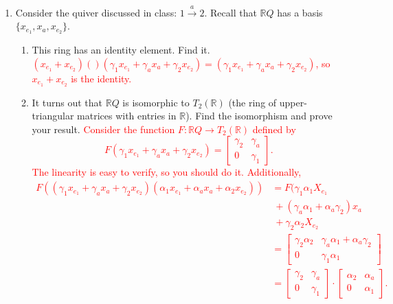 \documentclass[12pt]{article}
\newcommand{\bbR}{\mathbb{R}}
\newcommand{\solution}[1]{\textcolor{red}{#1}}
\begin{document}
\begin{enumerate}
\item Consider the quiver discussed in class: $1\xrightarrow{a}
  2$. Recall that $\bbR Q$ has a basis $\{x_{e_1}, x_a,
  x_{e_2}\}$.
  \begin{enumerate}
  \item This ring has an identity element. Find it.
\solution{
$(x_{e_1}+x_{e_2})()(\gamma_1 x_{e_1}+\gamma_a x_a + \gamma_2 x_{e_2} )
=(\gamma_1 x_{e_1}+\gamma_a x_a + \gamma_2 x_{e_2})$, so
$x_{e_1}+x_{e_2}$ is the identity.  }
  \item It turns out that $\bbR Q$ is isomorphic to $T_2(\bbR)$ (the
    ring of upper-triangular matrices with entries in $\bbR$). Find
    the isomorphism and prove your result. 
\solution{
Consider the function $F: \bbR Q \rightarrow T_2(\bbR)$ defined by 
\[F(\gamma_1 x_{e_1}+\gamma_a x_a + \gamma_2 x_{e_2} )
  = \begin{bmatrix} \gamma_2 & \gamma_a \\ 0 &
    \gamma_1\end{bmatrix}.\]
The linearity is easy to verify, so you should do it. Additionally,
\begin{align*}
  F((\gamma_1 x_{e_1}+\gamma_a x_a + \gamma_2 x_{e_2})(\alpha_1
  x_{e_1}+\alpha_a x_a + \alpha_2 x_{e_2} )) &= F(\gamma_1 \alpha_1
                                               X_{e_1} \\ & \ +
                                                            (\gamma_a
                                                            \alpha_1+\alpha_a
                                                            \gamma_2)
                                                            x_a \\ & \
                                                                     +
                                                                     \gamma_2
                                                                     \alpha_2
                                                                     X_{e_2}\\
&= \begin{bmatrix} \gamma_2 \alpha_2 & \gamma_a \alpha_1 + \alpha_a
  \gamma_2 \\ 0 & \gamma_1 \alpha_1 \end{bmatrix}\\ &= \begin{bmatrix}
  \gamma_2 & \gamma_a \\ 0 & \gamma_1\end{bmatrix}
                             \cdot \begin{bmatrix} \alpha_2 & \alpha_a
                               \\ 0 & \alpha_1\end{bmatrix} .
\end{align*}
}
  \end{enumerate}


\end{enumerate}
\end{document}

